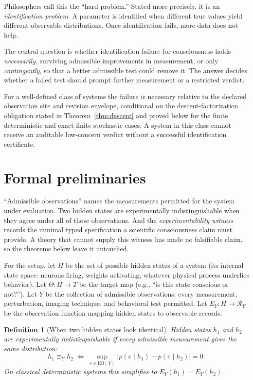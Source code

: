 \documentclass[11pt]{article}
\newtheorem{definition}{Definition}
\begin{document}
Philosophers call this the ``hard problem.'' Stated more precisely, it is an
\emph{identification problem}. A parameter is identified when different true
values yield different observable distributions. Once identification fails, more
data does not help.

The central question is whether identification failure for consciousness holds
\emph{necessarily}, surviving admissible improvements in measurement, or only
\emph{contingently}, so that a better admissible test could remove it. The
answer decides whether a failed test should prompt further measurement or a
restricted verdict.

For a well-defined class of systems the failure is necessary
relative to the declared observation site and revision envelope, conditional on
the descent-factorization obligation stated in Theorem~\ref{thm:descent} and
proved below for the finite deterministic and exact finite stochastic cases.
A system in this class cannot receive an auditable low-concern verdict without
a successful identification certificate.

\section{Formal preliminaries}
\label{sec:prelim}

``Admissible observations'' names
the measurements permitted for the system under evaluation. Two hidden states
are experimentally indistinguishable when they agree under all of those
observations. And the \emph{experimentability witness} records the minimal
typed specification a scientific consciousness claim must provide. A theory
that cannot supply this witness has made no falsifiable claim, so the theorems
below leave it untouched.

For the setup, let $H$ be the set of possible hidden states of a system (its
internal state
space: neurons firing, weights activating, whatever physical process underlies
behavior).
Let $\Theta: H \to T$ be the target map (e.g., ``is this state conscious or
not?'').
Let $Y$ be the collection of admissible observations: every measurement,
perturbation, imaging technique, and behavioral test permitted.
Let $E_Y: H \to \mathcal{R}_Y$ be the observation function mapping hidden
states to observable records.

\begin{definition}[When two hidden states look identical]
\label{def:congruence}
Hidden states $h_1$ and $h_2$ are \emph{experimentally indistinguishable} if
every admissible measurement gives the same distribution:
\[
h_1 \equiv_Y h_2
\;\iff\;
\sup_{e \in \mathrm{Eff}(Y)} |p(e \mid h_1) - p(e \mid h_2)| = 0.
\]
On classical deterministic systems this simplifies to
$E_Y(h_1) = E_Y(h_2)$.
\end{definition}
\end{document}
